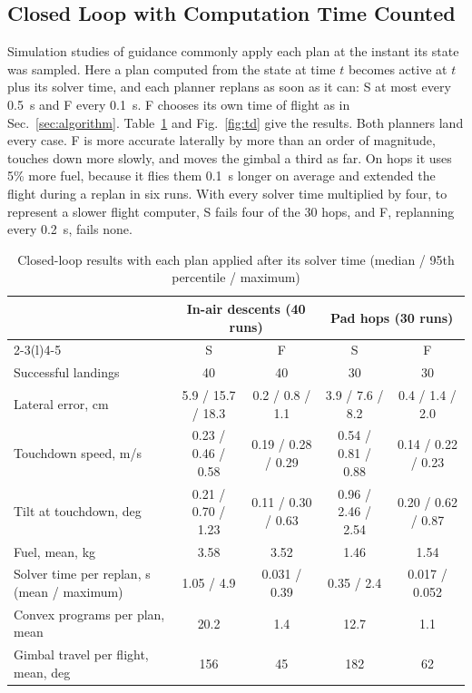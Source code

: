 \subsection{Closed Loop with Computation Time Counted}
Simulation studies of guidance commonly apply each plan at the instant its state was sampled. Here a plan computed from the state
at time $t$ becomes active at $t$ plus its solver time, and each planner replans as soon as it can: S at most every 0.5~s and F
every 0.1~s. F chooses its own time of flight as in Sec.~\ref{sec:algorithm}. Table~\ref{tab:closed} and Fig.~\ref{fig:td} give
the results. Both planners land every case. F is more accurate laterally by more than an order of magnitude, touches down more
slowly, and moves the gimbal a third as far. On hops it uses 5\% more fuel, because it flies them 0.1~s longer on average and
extended the flight during a replan in six runs. With every solver time multiplied by four, to represent a slower flight
computer, S fails four of the 30 hops, and F, replanning every 0.2~s, fails none.

\begin{table}[t]\centering
\caption{Closed-loop results with each plan applied after its solver time (median / 95th percentile / maximum)}\label{tab:closed}
\small\setlength{\tabcolsep}{4.5pt}
\begin{tabular}{@{}lcccc@{}}\toprule
 & \multicolumn{2}{c}{In-air descents (40 runs)} & \multicolumn{2}{c}{Pad hops (30 runs)} \\\cmidrule(lr){2-3}\cmidrule(l){4-5}
 & S & F & S & F \\\midrule
Successful landings & 40 & 40 & 30 & 30 \\
Lateral error, cm & 5.9 / 15.7 / 18.3 & 0.2 / 0.8 / 1.1 & 3.9 / 7.6 / 8.2 & 0.4 / 1.4 / 2.0 \\
Touchdown speed, m/s & 0.23 / 0.46 / 0.58 & 0.19 / 0.28 / 0.29 & 0.54 / 0.81 / 0.88 & 0.14 / 0.22 / 0.23 \\
Tilt at touchdown, deg & 0.21 / 0.70 / 1.23 & 0.11 / 0.30 / 0.63 & 0.96 / 2.46 / 2.54 & 0.20 / 0.62 / 0.87 \\
Fuel, mean, kg & 3.58 & 3.52 & 1.46 & 1.54 \\
Solver time per replan, s (mean / maximum) & 1.05 / 4.9 & 0.031 / 0.39 & 0.35 / 2.4 & 0.017 / 0.052 \\
Convex programs per plan, mean & 20.2 & 1.4 & 12.7 & 1.1 \\
Gimbal travel per flight, mean, deg & 156 & 45 & 182 & 62 \\\bottomrule
\end{tabular}
\end{table}

